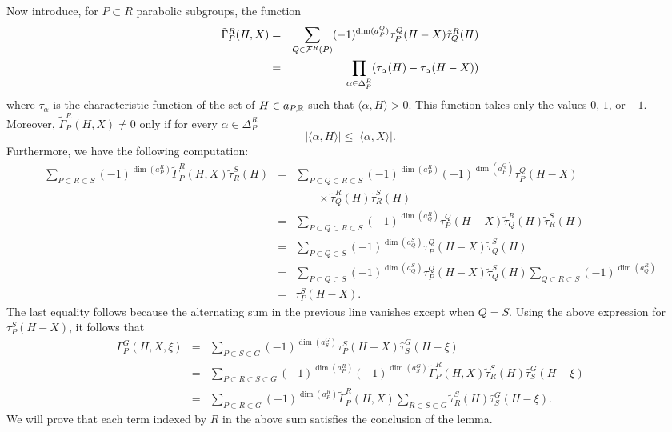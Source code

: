 \begin{paragr}
\begin{preuve}
Now introduce, for $P\subset R$ parabolic subgroups, the function 
\begin{eqnarray*}
 \tilde{\Gamma}_P^R(H,X)&=&\sum_{Q\in \mathcal{F}^R(P)} (-1)^{\dim(a_P^Q)}\tau_P^Q(H-X) \tilde{\tau}_{Q}^{R}(H) \\
&=& \prod_{\alpha \in \Delta_P^R }( \tau_\alpha(H)-\tau_\alpha(H-X))
\end{eqnarray*}
where $\tau_\alpha$ is the characteristic function of the set of $H\in a_{P,\mathbb{R}}$ such that $\langle \alpha,H\rangle >0$. This function takes only the values $0$, $1$, or $-1$. Moreover, $\tilde{\Gamma}_P^R(H,X)\neq 0$ only if for every $\alpha\in \Delta_P^R$
$$|\langle \alpha,H\rangle| \leq |\langle \alpha,X\rangle|.$$
Furthermore, we have the following computation:
\begin{eqnarray*}
  \sum_{P\subset R\subset S} (-1)^{\dim(a_P^R)} \tilde{\Gamma}_P^R(H,X)\tilde{\tau}_{R}^{S}(H)&=& \sum_{P\subset Q\subset R\subset S} (-1)^{\dim(a_P^R)} (-1)^{\dim(a_P^Q)} \tau_P^Q(H-X)\\
  &&{}\qquad\times \tilde{\tau}_{Q}^{R}(H) \tilde{\tau}_{R}^{S}(H)\\
&=&  \sum_{P\subset  Q \subset R\subset S} (-1)^{\dim(a_Q^R)}  \tau_P^Q(H-X) \tilde{\tau}_{Q}^{R}(H) \tilde{\tau}_{R}^{S}(H)\\
&=&  \sum_{P\subset  Q \subset S} (-1)^{\dim(a_Q^S)}  \tau_P^Q(H-X) \tilde{\tau}_{Q}^{S}(H)\\
&=&  \sum_{P\subset  Q \subset S} (-1)^{\dim(a_Q^S)}  \tau_P^Q(H-X) \tilde{\tau}_{Q}^{S}(H) \sum_{  Q \subset R\subset S} (-1)^{\dim(a_Q^R)}\\
&=& \tau_P^S(H-X).
\end{eqnarray*}
The last equality follows because the alternating sum in the previous line vanishes except when $Q=S$. Using the above expression for $\tau_P^S(H-X)$, it follows that
\begin{eqnarray*}
  \Gamma_P^G(H,X,\xi)&=&\sum_{P\subset S\subset G }   (-1)^{\dim(a_S^G)} \tau_P^S(H-X)\hat{\tau}_S^G(H-\xi)\\
&=&\sum_{P\subset R\subset S\subset G }(-1)^{\dim(a_P^R)}(-1)^{\dim(a_S^G)} \tilde{\Gamma}_P^R(H,X)\tilde{\tau}_{R}^{S}(H) \hat{\tau}_S^G(H-\xi)\\
&=& \sum_{P\subset R \subset G }(-1)^{\dim(a_P^R)} \tilde{\Gamma}_P^R(H,X) \sum_{R\subset S\subset G }\tilde{\tau}_{R}^{S}(H) \hat{\tau}_S^G(H-\xi).
\end{eqnarray*}
We will prove that each term indexed by $R$ in the above sum satisfies the conclusion of the lemma. 


\end{preuve}
\end{paragr}
